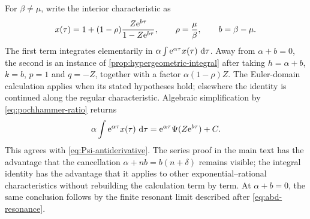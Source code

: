 For \(\beta\neq\mu\), write the interior characteristic as
\begin{equation}
  x(\tau)
  =1+(1-\rho)
    \frac{Z\mathrm{e}^{b\tau}}{1-Z\mathrm{e}^{b\tau}},
  \qquad
  \rho=\frac{\mu}{\beta},
  \qquad b=\beta-\mu.
  \label{eq:appendix-x-characteristic}
\end{equation}
The first term integrates elementarily in
\(\alpha\int\mathrm{e}^{\alpha\tau}x(\tau)\,\,\mathrm{d}\tau\).  Away from
\(\alpha+b=0\), the second is an instance of
\cref{prop:hypergeometric-integral} after taking
\(h=\alpha+b\), \(k=b\), \(p=1\) and \(q=-Z\), together with a factor
\(\alpha(1-\rho)Z\).  The Euler-domain calculation applies when its stated
hypotheses hold; elsewhere the identity is continued along the regular
characteristic.  Algebraic simplification by
\cref{eq:pochhammer-ratio} returns
\begin{equation}
  \alpha\int\mathrm{e}^{\alpha\tau}x(\tau)\,\,\mathrm{d}\tau
  =\mathrm{e}^{\alpha\tau}\Psi(Z\mathrm{e}^{b\tau})+C.
\end{equation}
This agrees with \cref{eq:Psi-antiderivative}.  The series proof in the main text
has the advantage that the cancellation
\(\alpha+nb=b(n+\delta)\) remains visible; the integral identity has the advantage
that it applies to other exponential--rational characteristics without rebuilding
the calculation term by term.  At \(\alpha+b=0\), the same conclusion follows by
the finite resonant limit described after \cref{eq:abd-resonance}.
